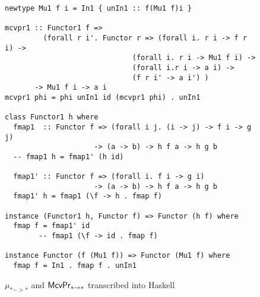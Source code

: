 \begin{figure}
\begin{singlespace}
\begin{lstlisting}
newtype Mu1 f i = In1 { unIn1 :: f(Mu1 f)i }

mcvpr1 :: Functor1 f =>
         (forall r i'. Functor r => (forall i. r i -> f r i) ->
                              (forall i. r i -> Mu1 f i) ->
                              (forall i.r i -> a i) ->
                              (f r i' -> a i') )
       -> Mu1 f i -> a i
mcvpr1 phi = phi unIn1 id (mcvpr1 phi) . unIn1

class Functor1 h where
  fmap1  :: Functor f => (forall i j. (i -> j) -> f i -> g j)
                     -> (a -> b) -> h f a -> h g b
  -- fmap1 h = fmap1' (h id)

  fmap1' :: Functor f => (forall i. f i -> g i)
                     -> (a -> b) -> h f a -> h g b
  fmap1' h = fmap1 (\f -> h . fmap f)

instance (Functor1 h, Functor f) => Functor (h f) where
  fmap f = fmap1' id
        -- fmap1 (\f -> id . fmap f)

instance Functor (f (Mu1 f)) => Functor (Mu1 f) where
  fmap f = In1 . fmap f . unIn1
\end{lstlisting}
\end{singlespace}
\caption{$\mu_{* -> *}$ and $\mathsf{McvPr}_{* -> *}$ transcribed into Haskell}
\label{fig:HaskellFunctor1}
\end{figure}


